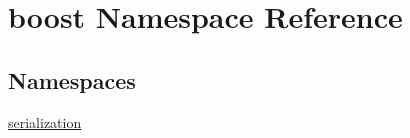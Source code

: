 \hypertarget{namespaceboost}{\section{boost Namespace Reference}
\label{namespaceboost}
}
\subsection*{Namespaces}
\begin{DoxyCompactItemize}
\item 
\hyperlink{namespaceboost_1_1serialization}{serialization}
\end{DoxyCompactItemize}
